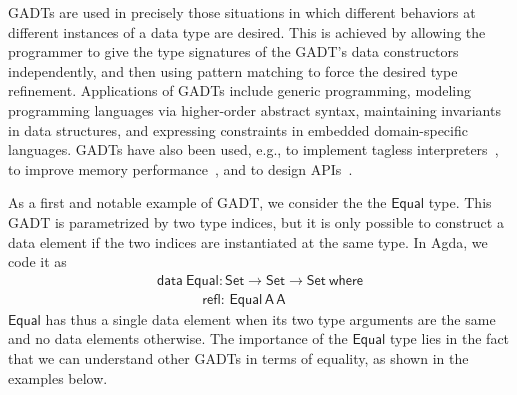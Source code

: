 \documentclass[9pt]{entcs} \usepackage{entcsmacro}
\begin{document}
GADTs are used in precisely those situations in which different
behaviors at different instances of a data type are desired. This is
achieved by allowing the programmer to give the type signatures of the
GADT's data constructors independently, and then using pattern
matching to force the desired type refinement. Applications of GADTs
include generic programming, modeling programming languages via
higher-order abstract syntax, maintaining invariants in data
structures, and expressing constraints in embedded domain-specific
languages. GADTs have also been used, e.g., to implement tagless
interpreters~\cite{pl04,pr06,pvww06}, to improve memory
performance~\cite{min15}, and to design APIs~\cite{pen20}.

\begin{example}\label{example:equal}
As a first and notable example of GADT, we consider the the $\mathsf{Equal}$ type.
This GADT is parametrized by two type indices,
but it is only possible to construct a data element if the two indices are instantiated at the same type.
In Agda, we code it as
\begin{equation}\label{eq:equal}
\begin{array}{l}
\mathsf{data\ Equal : Set \to Set \to Set\ where}\\
\mathsf{\;\;\;\;\;\;\;\;\;\;\;\,refl :\, Equal\,A\,A}
\end{array}
\end{equation}
$\mathsf{Equal}$ has thus a single data element when its two type arguments
are the same and no data elements otherwise.
The importance of the $\mathsf{Equal}$ type lies in the fact that we can understand other GADTs in terms of equality,
as shown in the examples below.
\end{example}
\end{document}
